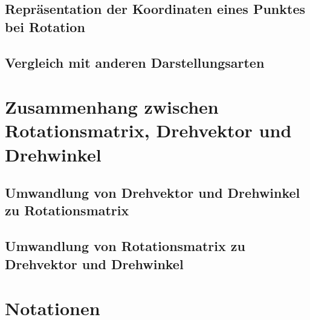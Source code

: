 \documentclass[a4paper, 11pt, accentcolor = tud3b]{tudreport}
\begin{document}
		\section{Repräsentation der Koordinaten eines Punktes bei Rotation} %

		\section{Vergleich mit anderen Darstellungsarten} %

	\chapter{Zusammenhang zwischen Rotationsmatrix, Drehvektor und Drehwinkel} %

		\section{Umwandlung von Drehvektor und Drehwinkel zu Rotationsmatrix} %

		\section{Umwandlung von Rotationsmatrix zu Drehvektor und Drehwinkel} %

	\chapter{Notationen} %
\end{document}
